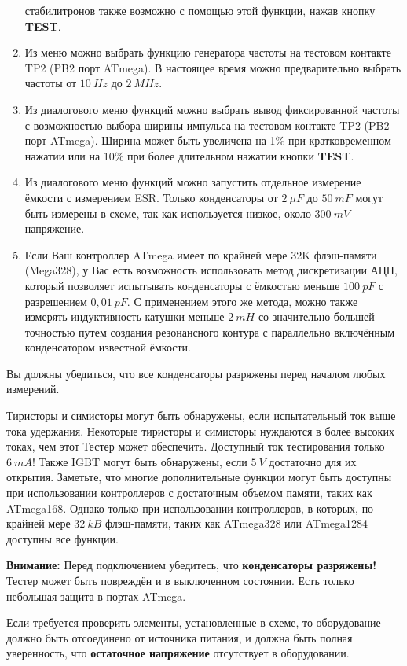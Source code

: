 \begin{enumerate}
стабилитронов также возможно с помощью этой функции, нажав кнопку \textbf{ TEST}. 
\item Из меню можно выбрать функцию генератора частоты на тестовом контакте TP2 (PB2 порт ATmega).
В настоящее время можно предварительно выбрать частоты от \(10~Hz\) до \(2~MHz\).
\item Из диалогового меню функций можно выбрать вывод фиксированной частоты с возможностью 
выбора ширины импульса на тестовом контакте TP2 (PB2 порт ATmega). Ширина может быть 
увеличена на 1\% при кратковременном нажатии или на 10\% при более длительном нажатии кнопки \textbf{ TEST}.
\item Из диалогового меню функций можно запустить отдельное измерение ёмкости с измерением ESR.
Только конденсаторы от \(2~\mu F\) до \(50~mF\) могут быть измерены в схеме, так как используется низкое, около \(300~mV\)
напряжение.
\item Если Ваш контроллер ATmega имеет по крайней мере 32K флэш-памяти (Mega328), у Вас есть возможность использовать
метод дискретизации АЦП, который позволяет испытывать конденсаторы с ёмкостью меньше \(100~pF\) с разрешением \(0,01~pF\).
С применением этого же метода, можно также измерять индуктивность катушки меньше \(2~mH\) со значительно большей
точностью путем создания резонансного контура с параллельно включённым конденсатором известной ёмкости.

\end{enumerate}
Вы должны убедиться, что все конденсаторы разряжены перед началом любых измерений.

Тиристоры и симисторы могут быть обнаружены, если испытательный ток выше тока удержания. Некоторые тиристоры и 
симисторы нуждаются в более высоких токах, чем этот Тестер может обеспечить. Доступный ток тестирования только 
\(6~mA\)!
Также IGBT могут быть обнаружены, если \(5~V\) достаточно для их открытия.
Заметьте, что многие дополнительные функции могут быть доступны при использовании контроллеров с достаточным объемом памяти, таких как ATmega168.
Однако только при использовании контроллеров, в которых, по крайней мере \(32~kB\) флэш-памяти, таких как ATmega328 или ATmega1284 доступны все функции.

\vspace{1cm}
\textbf{{\Large Внимание:}} Перед подключением убедитесь, что  \textbf{ конденсаторы разряжены!} Тестер может быть 
повреждён и в выключенном состоянии. Есть только небольшая защита в портах ATmega.

Если требуется проверить элементы, установленные в схеме, то оборудование должно быть отсоединено от источника питания, 
и должна быть полная уверенность, что  \textbf{ остаточное напряжение} отсутствует в оборудовании. 

